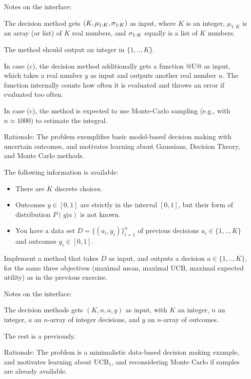 Notes on the interface:
\begin{items}
\item The decision method gets $(K,\mu_{1:K}, \sigma_{1:K})$ as input, where $K$ is an integer, $\mu_{1:K}$ is an array (or list) of $K$ real numbers, and $\sigma_{1:K}$ equally is a list of $K$ numbers.
\item The method should output an integer in $\{1,..,K\}$.
\item In case (c), the decision method additionally gets a function @U@ as input, which takes a real number $y$ as input and outputs another real number $u$. The function internally counts how often it is evaluated and throws an error if evaluated too often.
\item In case (c), the method is expected to use Monte-Carlo sampling (e.g., with $n\approx 1000$) to estimate the integral.
\end{items}

Rationale: The problem exemplifies basic model-based decision making with uncertain outcomes, and motivates learning about Gaussians, Decision Theory, and Monte Carlo methods.

\label{secDiscreteData}

The following information is available:
\begin{itemize}
\item There are $K$ discrete choices.
\item Outcomes $y\in[0,1]$ are strictly in the interval $[0,1]$, but their form of distribution $P(y|a)$ is not known.
\item You have a data set $D=\{(a_i, y_i)\}_{i=1}^n$ of previous decisions $a_i\in\{1,..,K\}$ and outcomes $y_i\in[0,1]$.
\end{itemize}

Implement a method that takes $D$ as input, and outputs a decision $a\in\{1,..,K\}$, for the same three objectives (maximal mean, maximal UCB, maximal expected utility) as in the previous exercise.

Notes on the interface:
\begin{items}
\item The decision methods gets $(K,n,a,y)$ as input, with $K$ an integer, $n$ an integer, $a$ an $n$-array of integer decisions, and $y$ an $n$-array of outcomes.
\item The rest is a previously.
\end{items}

Rationale: The problem is a minimalistic data-based decision making example, and motivates learning about UCB${}_1$, and reconsidering Monte Carlo if samples are already available.

